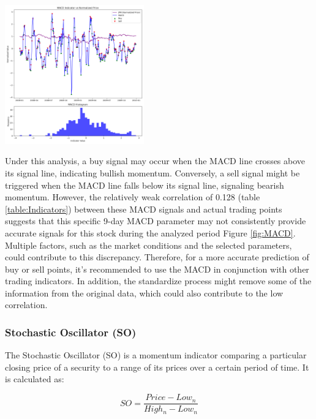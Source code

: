 \documentclass[
	letterpaper, %
]{jdf}
\begin{document}
\begin{jdffigure}
	\includegraphics[height=6cm]{Figures/MACD_hist_and_price.png} \\
	\label{fig:MACD}%
\end{jdffigure}
	
Under this analysis, a buy signal may occur when the MACD line crosses above its signal line, indicating bullish momentum. Conversely, a sell signal might be triggered when the MACD line falls below its signal line, signaling bearish momentum. However, the relatively weak correlation of 0.128 (table \ref{table:Indicators}) between these MACD signals and actual trading points suggests that this specific 9-day MACD parameter may not consistently provide accurate signals for this stock during the analyzed period Figure \ref{fig:MACD}. Multiple factors, such as the market conditions and the selected parameters, could contribute to this discrepancy. Therefore, for a more accurate prediction of buy or sell points, it's recommended to use the MACD in conjunction with other trading indicators. In addition, the standardize process might remove some of the information from the original data, which could also contribute to the low correlation.

\subsubsection{Stochastic Oscillator (SO)}

The Stochastic Oscillator (SO) is a momentum indicator comparing a particular closing price of a security to a range of its prices over a certain period of time. It is calculated as:

\[
SO = \frac{Price - Low_{n}}{High_{n} - Low_{n}}
\]
\end{document}
